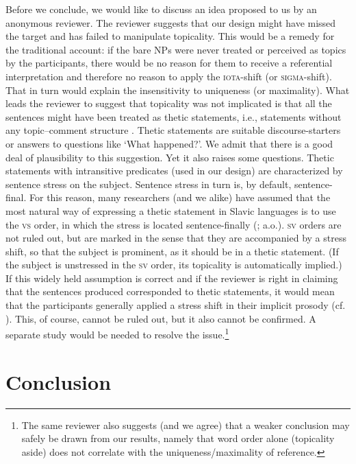 \documentclass[output=paper]{langscibook}
\begin{document}
Before we conclude, we would like to discuss an idea proposed to us by an anonymous reviewer. The reviewer suggests that our design might have missed the target and has failed to manipulate topicality. This would be a remedy for the traditional account: if the bare NPs were never treated or perceived as topics by the participants, there would be no reason for them to receive a referential interpretation and therefore no reason to apply the \textsc{iota}-shift (or \textsc{sigma}-shift). That in turn would explain the insensitivity to uniqueness (or maximality). What leads the reviewer to suggest that topicality was not implicated is that all the sentences might have been treated as thetic statements, i.e., statements without any topic--comment structure \citep{Sasse1987}. Thetic statements are suitable discourse-starters or answers to questions like `What happened?'. We admit that there is a good deal of plausibility to this suggestion. Yet it also raises some questions. Thetic statements with intransitive predicates (used in our design) are characterized by sentence stress on the subject. Sentence stress in turn is, by default, sentence-final. For this reason, many researchers (and we alike) have assumed that the most natural way of expressing a thetic statement in Slavic languages is to use the \textsc{vs} order, in which the stress is located sentence-finally (\citealt{Junghanns2002Thetisch,Geist2010}; a.o.). \textsc{sv} orders are not ruled out, but are marked in the sense that they are accompanied by a stress shift, so that the subject is prominent, as it should be in a thetic statement. (If the subject is unstressed in the \textsc{sv} order, its topicality is automatically implied.) If this widely held assumption is correct and if the reviewer is right in claiming that the sentences produced corresponded to thetic statements, it would mean that the participants generally applied a stress shift in their implicit prosody (cf. \citealt{Fodor2002}). This, of course, cannot be ruled out, but it also cannot be confirmed. A separate study would be needed to resolve the issue.\footnote{The same reviewer also suggests (and we agree) that a weaker conclusion may safely be drawn from our results, namely that word order alone (topicality aside) does not correlate with the uniqueness/maximality of reference.\label{sim-dem:fn:thetic}}

\section{Conclusion}\label{sim-dem:sec:concl}
\end{document}
